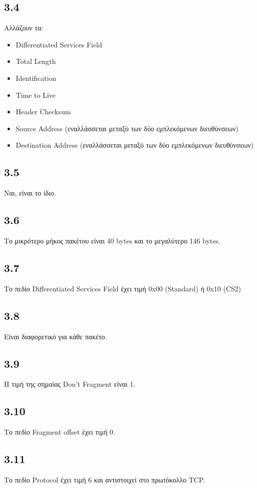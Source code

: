 		\subsection*{3.4}
			Αλλάζουν τα:
			\begin{itemize}
				\item Differentiated Services Field
				\item Total Length
				\item Identification
				\item Time to Live
				\item Header Checksum
				\item Source Address (εναλλάσσεται μεταξύ των δύο εμπλεκόμενων διευθύνσεων)
				\item Destination Address (εναλλάσσεται μεταξύ των δύο εμπλεκόμενων διευθύνσεων)
			\end{itemize}

		\subsection*{3.5}
			Ναι, είναι το ίδιο.

		\subsection*{3.6}
			Το μικρότερο μήκος πακέτου είναι 40 bytes και το μεγαλύτερο 146 bytes.

		\subsection*{3.7}
			Το πεδίο Differentiated Services Field έχει τιμή 0x00 (Standard) ή 0x10 (CS2)

		\subsection*{3.8}
			Είναι διαφορετικό για κάθε πακέτο.

		\subsection*{3.9}
			Η τιμή της σημαίας Don't Fragment είναι 1.

		\subsection*{3.10}
			Το πεδίο Fragment offset έχει τιμή 0.

		\subsection*{3.11}
			Το πεδίο Protocol έχει τιμή 6 και αντιστοιχεί στο πρωτόκολλο TCP.

